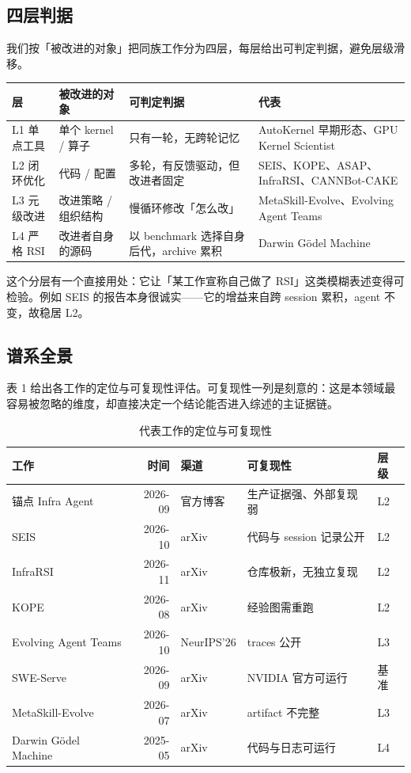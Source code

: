 \subsection{四层判据}

我们按「被改进的对象」把同族工作分为四层，每层给出可判定判据，避免层级滑移。


\begin{table}[t]
\centering
\footnotesize
\setlength{\tabcolsep}{4pt}
\label{tab:2}
\begin{tabularx}{\textwidth}{llXX}
\toprule
层 & 被改进的对象 & 可判定判据 & 代表 \\
\midrule
L1 单点工具 & 单个 kernel / 算子 & 只有一轮，无跨轮记忆 & AutoKernel 早期形态、GPU Kernel Scientist \\
L2 闭环优化 & 代码 / 配置 & 多轮，有反馈驱动，但改进者固定 & SEIS、KOPE、ASAP、InfraRSI、CANNBot-CAKE \\
L3 元级改进 & 改进策略 / 组织结构 & 慢循环修改「怎么改」 & MetaSkill-Evolve、Evolving Agent Teams \\
L4 严格 RSI & 改进者自身的源码 & 以 benchmark 选择自身后代，archive 累积 & Darwin Gödel Machine \\
\bottomrule
\end{tabularx}
\end{table}

这个分层有一个直接用处：它让「某工作宣称自己做了 RSI」这类模糊表述变得可检验。例如 SEIS 的报告本身很诚实——它的增益来自跨 session 累积，agent 不变，故稳居 L2。


\subsection{谱系全景}

表 1 给出各工作的定位与可复现性评估。可复现性一列是刻意的：这是本领域最容易被忽略的维度，却直接决定一个结论能否进入综述的主证据链。


\begin{table}[t]
\centering
\footnotesize
\setlength{\tabcolsep}{4pt}
\caption{代表工作的定位与可复现性}
\label{tab:3}
\begin{tabular}{lrlll}
\toprule
工作 & 时间 & 渠道 & 可复现性 & 层级 \\
\midrule
锚点 Infra Agent & 2026-09 & 官方博客 & 生产证据强、外部复现弱 & L2 \\
SEIS & 2026-10 & arXiv & 代码与 session 记录公开 & L2 \\
InfraRSI & 2026-11 & arXiv & 仓库极新，无独立复现 & L2 \\
KOPE & 2026-08 & arXiv & 经验图需重跑 & L2 \\
Evolving Agent Teams & 2026-10 & NeurIPS'26 & traces 公开 & L3 \\
SWE-Serve & 2026-09 & arXiv & NVIDIA 官方可运行 & 基准 \\
MetaSkill-Evolve & 2026-07 & arXiv & artifact 不完整 & L3 \\
Darwin Gödel Machine & 2025-05 & arXiv & 代码与日志可运行 & L4 \\
\bottomrule
\end{tabular}
\end{table}


